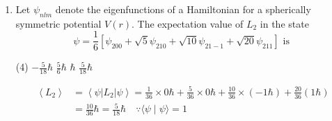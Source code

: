 \begin{enumerate}
{}
\begin{tasks}(4)
\task[\textbf{A.}] $0.60$
\task[\textbf{B.}] $0.90$
\task[\textbf{C.}]  $0.16$
\task[\textbf{D.}] $0.32$
\end{tasks}
\begin{answer}
\begin{align*}
\text{Probability: }\int_{0}^{a_{0}}\left|\frac{1}{\sqrt{\pi a_{0}^{3}}} e^{-r / a_{0}}\right|^{2} 4 \pi r^{2} d r&=\frac{4 \pi}{\pi a_{0}^{3}} \int_{0}^{a_{0}} r^{2} e^{-2 r / a_{0}} d r
\intertext{$=\frac{4}{a_{0}^{3}}\left\{\left[r^{2} e^{-2 r / a_{0}}\left(-\frac{a_{0}}{2}\right)\right]_{0}^{a_{0}}-\left[2 r\left(e^{-2 r / a_{0}}\right)\left(-\frac{a_{0}}{2}\right)\left(-\frac{a_{0}}{2}\right)\right]_{0}^{a_{0}}+\left[2 e^{-2 r / a_{0}}\left(-\frac{a_{0}}{2}\right)\left(-\frac{a_{0}}{2}\right)\left(-\frac{a_{0}}{2}\right)\right]_{0}^{\varphi_{0}}\right\}$}
\intertext{$=\frac{4}{a_{0}^{3}}\left[a_{0}^{2} e^{-\frac{2 a_{0}}{a_{0}}}\left(-\frac{a_{0}}{2}\right)-2 a_{0}\left(\frac{a_{0}^{2}}{4}\right) e^{-2 a_{0} / a_{0}}-\frac{a_{0}^{3}}{4} e^{-2 a_{0} / a_{0}}+2 e^{-0}\left(\frac{a_{0}^{3}}{8}\right)\right]$}\\
=\frac{4}{a_{0}^{3}}\left[-\frac{a_{0}^{3}}{2} \frac{1}{e^{2}}-\frac{a_{0}^{3}}{2} \frac{1}{e^{2}}-\frac{a_{0}^{3}}{4 e^{2}}+\frac{a_{0}^{3}}{4}\right]&=4\left[-\frac{5}{4 e^{2}}+\frac{1}{4}\right]=\left[-5 \times \frac{1}{e^{2}}+1\right]\\
&=[-5 \times 0.137+1]=[-0.685+1]=0.32
\end{align*}
So the correct answer is \textbf{Option (D)}
\end{answer}
	\item Let $\psi_{n l m}$ denote the eigenfunctions of a Hamiltonian for a spherically symmetric potential $V(r)$. The expectation value of $L_{2}$ in the state
	$$
	\psi=\frac{1}{6}\left[\psi_{200}+\sqrt{5} \psi_{210}+\sqrt{10} \psi_{21-1}+\sqrt{20} \psi_{211}\right] \text { is }
	$$
{	}
\begin{tasks}(4)
\task[\textbf{A.}] $-\frac{5}{18} \hbar$
\task[\textbf{B.}] $\frac{5}{6} \hbar$
\task[\textbf{C.}] $\hbar$
\task[\textbf{D.}] $\frac{5}{18} \hbar$
\end{tasks}
\begin{answer}
\begin{align*}
\left\langle L_{2}\right\rangle&=\left\langle\psi\left|L_{2}\right| \psi\right\rangle=\frac{1}{36} \times 0 \hbar+\frac{5}{36} \times 0 \hbar+\frac{10}{36} \times(-1 \hbar)+\frac{20}{36}(1 \hbar)\\&=\frac{10}{36} \hbar=\frac{5}{18} \hbar \quad \because\langle\psi \mid \psi\rangle=1

\end{align*}
\end{answer}
\end{enumerate}
